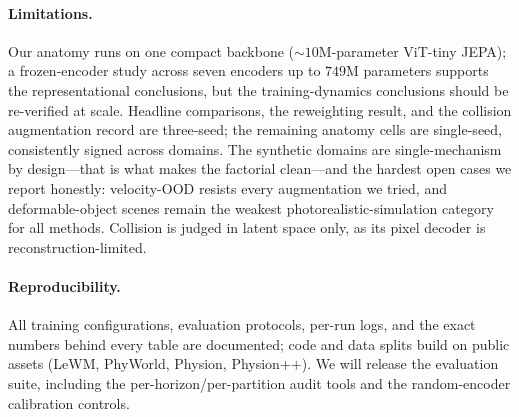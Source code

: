 \paragraph{Limitations.}
Our anatomy runs on one compact backbone (${\sim}10$M-parameter ViT-tiny JEPA); a frozen-encoder study across seven encoders up to $749$M parameters supports the representational conclusions, but the training-dynamics conclusions should be re-verified at scale. Headline comparisons, the reweighting result, and the collision augmentation record are three-seed; the remaining anatomy cells are single-seed, consistently signed across domains. The synthetic domains are single-mechanism by design---that is what makes the factorial clean---and the hardest open cases we report honestly: velocity-OOD resists every augmentation we tried, and deformable-object scenes remain the weakest photorealistic-simulation category for all methods. Collision is judged in latent space only, as its pixel decoder is reconstruction-limited.

\paragraph{Reproducibility.}
All training configurations, evaluation protocols, per-run logs, and the exact numbers behind every table are documented; code and data splits build on public assets (LeWM, PhyWorld, Physion, Physion++). We will release the evaluation suite, including the per-horizon/per-partition audit tools and the random-encoder calibration controls.
